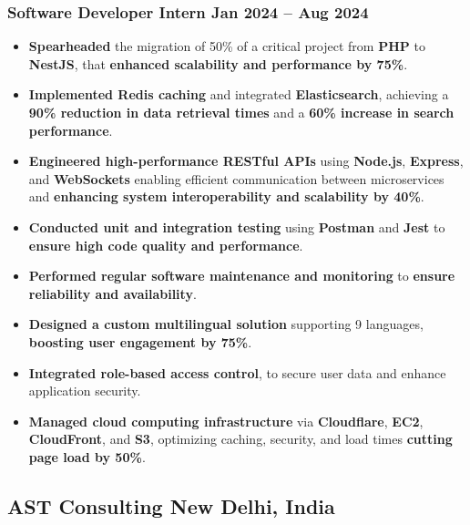 \documentclass[10pt]{article}
\newcommand{\rside}[1]{
  \hfill {\small\color{accent} #1}%
}
\begin{document}
\subsubsection{Software Developer Intern \rside{Jan 2024 -- Aug 2024}}
\begin{itemize}
  \item \textbf{Spearheaded} the migration of 50\% of a critical project from \textbf{PHP} to \textbf{NestJS}, that \textbf{enhanced scalability and performance by 75\%}.
  \item \textbf{Implemented Redis caching} and integrated \textbf{Elasticsearch}, achieving a \textbf{90\% reduction in data retrieval times} and a \textbf{60\% increase in search performance}.
  \item \textbf{Engineered high-performance RESTful APIs} using \textbf{Node.js}, \textbf{Express}, and \textbf{WebSockets} enabling efficient communication between microservices and \textbf{enhancing system interoperability and scalability by 40\%}.
  \item \textbf{Conducted unit and integration testing} using \textbf{Postman} and \textbf{Jest} to \textbf{ensure high code quality and performance}.
  \item \textbf{Performed regular software maintenance and monitoring} to \textbf{ensure reliability and availability}.
  \item \textbf{Designed a custom multilingual solution} supporting 9 languages, \textbf{boosting user engagement by 75\%}.
  \item \textbf{Integrated role-based access control}, to secure user data and enhance application security.
  \item \textbf{Managed cloud computing infrastructure} via \textbf{Cloudflare}, \textbf{EC2}, \textbf{CloudFront}, and \textbf{S3}, optimizing caching, security, and load times \textbf{cutting page load by 50\%}.
\end{itemize}

\subsection{AST Consulting \rside{New Delhi, India}}
\end{document}
